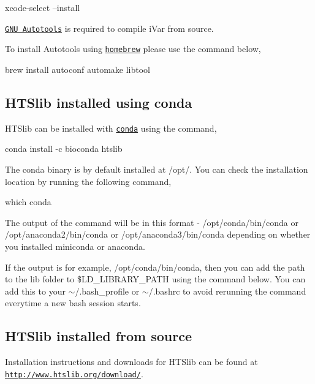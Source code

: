 \begin{DoxyCode}
xcode-select --install
\end{DoxyCode}


\href{https://www.gnu.org/software/automake/manual/html_node/Autotools-Introduction.html#Autotools-Introduction}{\tt G\+NU Autotools} is required to compile i\+Var from source.

To install Autotools using \href{https://brew.sh/}{\tt homebrew} please use the command below,


\begin{DoxyCode}
brew install autoconf automake libtool
\end{DoxyCode}
\hypertarget{installpage_autotoc_md3}{}\subsection{H\+T\+Slib installed using conda}\label{installpage_autotoc_md3}
H\+T\+Slib can be installed with \href{https://conda.io/docs/}{\tt conda} using the command,


\begin{DoxyCode}
conda install -c bioconda htslib
\end{DoxyCode}


The conda binary is by default installed at /opt/. You can check the installation location by running the following command,


\begin{DoxyCode}
which conda
\end{DoxyCode}


The output of the command will be in this format -\/ /opt/conda/bin/conda or /opt/anaconda2/bin/conda or /opt/anaconda3/bin/conda depending on whether you installed miniconda or anaconda.

If the output is for example, /opt/conda/bin/conda, then you can add the path to the lib folder to \$\+L\+D\+\_\+\+L\+I\+B\+R\+A\+R\+Y\+\_\+\+P\+A\+TH using the command below. You can add this to your $\sim$/.bash\+\_\+profile or $\sim$/.bashrc to avoid rerunning the command everytime a new bash session starts.


\hypertarget{installpage_autotoc_md4}{}\subsection{H\+T\+Slib installed from source}\label{installpage_autotoc_md4}
Installation instructions and downloads for H\+T\+Slib can be found at \href{http://www.htslib.org/download/}{\tt http\+://www.\+htslib.\+org/download/}.

